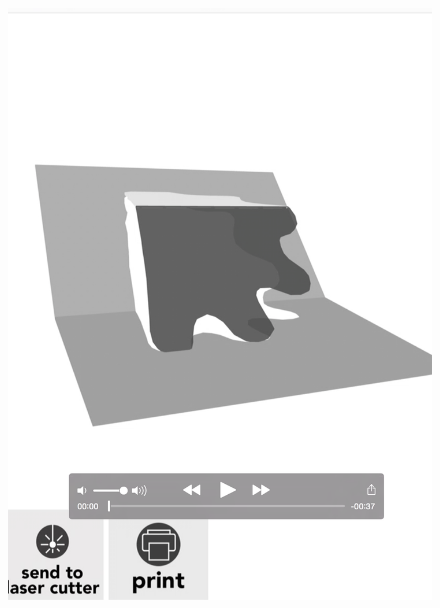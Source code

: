 \begin{figure}[htbp]
\centering
\includegraphics{figures/92_Appendix_Visual_Aids_Materials/video_card2.png}
\caption{}
\end{figure}

